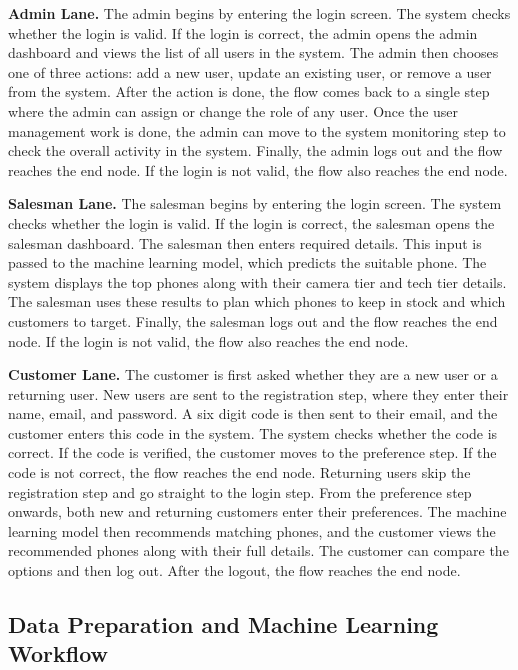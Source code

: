\documentclass[12pt, a4paper]{report}
\numberwithin{equation}{chapter}
\begin{document}
\textbf{Admin Lane.} The admin begins by entering the login screen. The system checks whether the login is valid. If the login is correct, the admin opens the admin dashboard and views the list of all users in the system. The admin then chooses one of three actions: add a new user, update an existing user, or remove a user from the system. After the action is done, the flow comes back to a single step where the admin can assign or change the role of any user. Once the user management work is done, the admin can move to the system monitoring step to check the overall activity in the system. Finally, the admin logs out and the flow reaches the end node. If the login is not valid, the flow also reaches the end node.

\textbf{Salesman Lane.} The salesman begins by entering the login screen. The system checks whether the login is valid. If the login is correct, the salesman opens the salesman dashboard. The salesman then enters required details. This input is passed to the machine learning model, which predicts the suitable phone. The system displays the top phones along with their camera tier and tech tier details. The salesman uses these results to plan which phones to keep in stock and which customers to target. Finally, the salesman logs out and the flow reaches the end node. If the login is not valid, the flow also reaches the end node.

\textbf{Customer Lane.} The customer is first asked whether they are a new user or a returning user. New users are sent to the registration step, where they enter their name, email, and password. A six digit code is then sent to their email, and the customer enters this code in the system. The system checks whether the code is correct. If the code is verified, the customer moves to the preference step. If the code is not correct, the flow reaches the end node. Returning users skip the registration step and go straight to the login step. From the preference step onwards, both new and returning customers enter their preferences. The machine learning model then recommends matching phones, and the customer views the recommended phones along with their full details. The customer can compare the options and then log out. After the logout, the flow reaches the end node.

\subsection{Data Preparation and Machine Learning Workflow}
\end{document}
